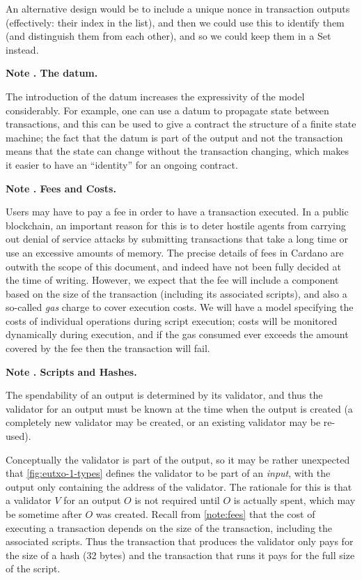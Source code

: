 \documentclass[a4paper]{article}
\newcounter{note}
\newcommand{\note}[1]{
  \bigskip
  \refstepcounter{note}
  \noindent\textbf{Note \thenote. #1}
}
\newcommand{\s}{\textsf}  %
\begin{document}
\noindent An alternative design would be to include a unique nonce in transaction outputs
(effectively: their index in the list), and then we could use this to identify
them (and distinguish them from each other), and so we could keep them in a \s{Set} instead.

\note{The datum.}
\label{note:datum}
The introduction of the datum
increases the expressivity of the model considerably. For example,
one can use a datum to propagate state between
transactions, and this can be used to give a contract the structure
of a finite state machine; the fact that the datum is part
of the output and not the transaction means that the state can
change without the transaction changing, which makes it easier to
have an ``identity'' for an ongoing contract.

\note{Fees and Costs.}
\label{note:fees}
Users may have to pay a fee in order to have a transaction executed.
In a public blockchain, an important reason for this is to deter
hostile agents from carrying out denial of service attacks by
submitting transactions that take a long time or use an excessive
amounts of memory.  The precise details of fees in Cardano are outwith
the scope of this document, and indeed have not been fully decided at
the time of writing. However, we expect that the fee will include a
component based on the size of the transaction (including its
associated scripts), and also a so-called \textit{gas} charge to cover
execution costs.  We will have a model specifying the costs of
individual operations during script execution; costs will be monitored
dynamically during execution, and if the gas consumed ever exceeds the
amount covered by the fee then the transaction will fail.

\note{Scripts and Hashes.}
\label{note:scripts} The spendability of an output is determined by
its validator, and thus the validator for an output must be
known at the time when the output is created (a completely new validator
may be created, or an existing validator may be re-used).

Conceptually the validator is part of the output, so it may be rather
unexpected that \cref{fig:eutxo-1-types} defines the validator
to be part of an \textit{input}, with the output only containing the
address of the validator.  The rationale for this is that a validator
$V$ for an output $O$ is not required until $O$ is actually spent,
which may be sometime after $O$ was created. Recall from
\cref{note:fees} that the cost of executing a transaction depends
on the size of the transaction, including the associated scripts.  Thus
the transaction that produces the validator only pays for the size of
a hash (32 bytes) and the transaction that runs it pays for the full
size of the script.
\end{document}
